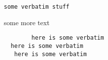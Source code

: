\verb!some verbatim stuff!

some more text
\begin{verbatim}
        here is some verbatim
  here is some verbatim
   here is some verbatim
\end{verbatim}
